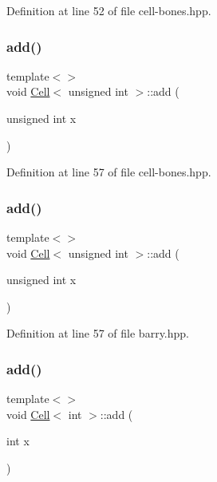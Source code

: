 Definition at line 52 of file cell-\/bones.\+hpp.

\mbox{\label{class_cell_ae22060201cf692bbf219827453d0acd2}} 
\subsubsection{\texorpdfstring{add()}{add()}\hspace{0.1cm}{\footnotesize\ttfamily [4/9]}}
{\footnotesize\ttfamily template$<$$>$ \\
void \hyperlink{class_cell}{Cell}$<$ unsigned int $>$\+::add (\begin{DoxyParamCaption}\item[{unsigned int}]{x }\end{DoxyParamCaption})\hspace{0.3cm}{\ttfamily [inline]}}



Definition at line 57 of file cell-\/bones.\+hpp.

\mbox{\label{class_cell_ae22060201cf692bbf219827453d0acd2}} 
\subsubsection{\texorpdfstring{add()}{add()}\hspace{0.1cm}{\footnotesize\ttfamily [5/9]}}
{\footnotesize\ttfamily template$<$$>$ \\
void \hyperlink{class_cell}{Cell}$<$ unsigned int $>$\+::add (\begin{DoxyParamCaption}\item[{unsigned int}]{x }\end{DoxyParamCaption})\hspace{0.3cm}{\ttfamily [inline]}}



Definition at line 57 of file barry.\+hpp.

\mbox{\label{class_cell_a74cb069c7341de33354c396465818c2f}} 
\subsubsection{\texorpdfstring{add()}{add()}\hspace{0.1cm}{\footnotesize\ttfamily [6/9]}}
{\footnotesize\ttfamily template$<$$>$ \\
void \hyperlink{class_cell}{Cell}$<$ int $>$\+::add (\begin{DoxyParamCaption}\item[{int}]{x }\end{DoxyParamCaption})\hspace{0.3cm}{\ttfamily [inline]}}



